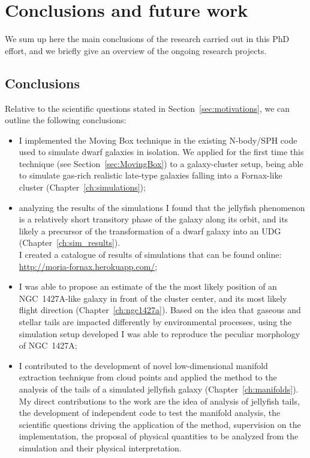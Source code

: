 
\chapter{Conclusions and future work}
\label{ch:conclusions}
We sum up here the main conclusions of the research carried out in this PhD effort, and we briefly give an overview of the ongoing research projects.\\[1ex]

\section{Conclusions}
Relative to the scientific questions stated in Section~\ref{sec:motivations}, we can outline the following conclusions:

\begin{itemize}
  \item I implemented the Moving Box technique in the existing N-body/SPH code used to simulate dwarf galaxies in isolation.
  We applied for the first time this technique (see Section~\ref{sec:MovingBox}) to a galaxy-cluster setup, being able to simulate gas-rich realistic late-type galaxies falling into a Fornax-like cluster (Chapter~\ref{ch:simulations});
  \item analyzing the results of the simulations I found that the jellyfish phenomenon is a relatively short transitory phase of the galaxy along its orbit, and its likely a precursor of the transformation of a dwarf galaxy into an UDG (Chapter~\ref{ch:sim_results}).\\
  I created a catalogue of results of simulations that can be found online: \url{http://moria-fornax.herokuapp.com/};
  \item I was able to propose an estimate of the the most likely position of an NGC~1427A-like galaxy in front of the cluster center, and its most likely flight direction (Chapter~\ref{ch:ngc1427a}).
  Based on the idea that gaseous and stellar tails are impacted differently by environmental processes, using the simulation setup developed I was able to reproduce the peculiar morphology of NGC~1427A;
  \item I contributed to the development of novel low-dimensional manifold extraction technique from cloud points and applied the method to the analysis of the tails of a simulated jellyfish galaxy (Chapter~\ref{ch:manifolds}). My direct contributions to the work are the idea of analysis of jellyfish tails, the development of  independent code to test the manifold analysis,
  the scientific questions driving the application of the method, supervision on the implementation, the proposal of physical quantities to be analyzed from the simulation and their physical interpretation.
\end{itemize}

